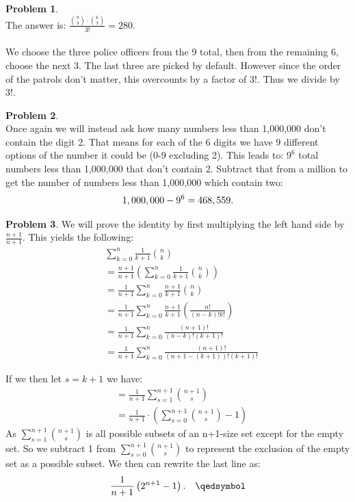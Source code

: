 \documentclass{article}
\theoremstyle{definition}
\newtheorem{problem}{Problem}
\begin{document}
\begin{problem}
    \ \\
    The answer is: $\frac{ {9\choose 3} \cdot {6 \choose 3} }{3!} = 280$.\\
    \\
    We choose the three police officers from the 9 total, then from the remaining 6, choose the next 3. The last three are picked by default.
    However since the order of the patrols don't matter, this overcounts by a factor of 3!. Thus we divide by 3!.
\end{problem}

\begin{problem}
    \ \\
    Once again we will instead ask how many numbers less than 1,000,000 don't contain the digit 2.
    That means for each of the 6 digits we have 9 different options of the number it could be (0-9 excluding 2). This leads to:
    $9^6$ total numbers less than 1,000,000 that don't contain 2. Subtract that from a million to get the number of numbers less than 1,000,000
    which contain two:
    \begin{equation*}
    1,000,000-9^6 = 468,559.\\
    \end{equation*}
\end{problem}

\begin{problem}
    We will prove the identity by first multiplying the left hand side by $\frac{n+1}{n+1}$. This yields the following:
    \begin{align*}
        &\sum_{k=0}^n \frac{1}{k+1} {n\choose k}\\
        &=\frac{n+1}{n+1}\left(  \sum_{k=0}^n \frac{1}{k+1} {n \choose k} \right)\\
        &=\frac{1}{n+1}\sum_{k=0}^n\frac{n+1}{k+1}{n\choose k}\\
        &=\frac{1}{n+1}\sum_{k=0}^n \frac{n+1}{k+1} \left( \frac{n!}{\left( n-k \right)!k!}  \right)\\
        &=\frac{1}{n+1} \sum_{k=0}^n \frac{(n+1)!}{(n-k)!(k+1)!}\\
        &=\frac{1}{n+1}\sum_{k=0}^n \frac{(n+1)!}{(n+1-(k+1))!(k+1)!}
    \end{align*}

    If we then let $s=k+1$ we have:
    \begin{align*}
        &=\frac{1}{n+1} \sum_{s=1}^{n+1} {{n+1}\choose s}\\
        &=\frac{1}{n+1} \cdot \left(  \sum_{s=0}^{n+1} {{n+1}\choose s} - 1 \right)
    \end{align*}
    As $\sum_{s=1}^{n+1} {{n+1}\choose {s}}$ is all possible subsets of an n+1-size set except for the empty set.
    So we subtract 1 from $\sum_{s=0}^{n+1} {{n+1}\choose s}$ to represent the exclusion of the empty set as a possible subset.
    We then can rewrite the last line as:
    \begin{align*}
        &\frac{1}{n+1}\left( 2^{n+1} -1  \right). &\qedsymbol
    \end{align*} 
\end{problem}
\end{document}
